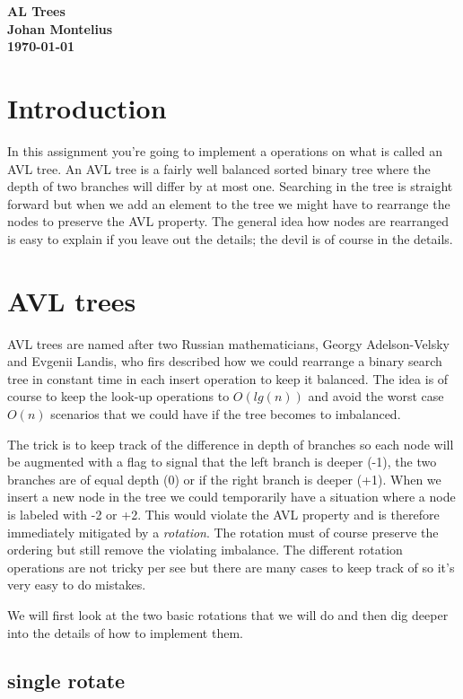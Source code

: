 \documentclass[a4paper,11pt]{article}
\newcommand{\nnsection}[1]{
\section*{#1}
\addcontentsline{toc}{section}{#1}
}
\begin{document}
\begin{center}
\vspace{20pt}
\textbf{\large AL Trees}\\
\vspace{10pt}
\textbf{Johan Montelius}\\ 
\vspace{10pt}
\textbf{\today}
\end{center}

\nnsection{Introduction}

In this assignment you're going to implement a operations on what is
called an AVL tree. An AVL tree is a fairly well balanced sorted
binary tree where the depth of two branches will differ by at most
one. Searching in the tree is straight forward but when we add an
element to the tree we might have to rearrange the nodes to preserve
the AVL property. The general idea how nodes are rearranged is easy to
explain if you leave out the details; the devil is of course in the
details.

\section{AVL trees}

AVL trees are named after two Russian mathematicians, Georgy
Adelson-Velsky and Evgenii Landis, who firs described how we could
rearrange a binary search tree in constant time in each insert
operation to keep it balanced. The idea is of course to keep the
look-up operations to $O(lg(n))$ and avoid the worst case $O(n)$
scenarios that we could have if the tree becomes to imbalanced.

The trick is to keep track of the difference in depth of branches so
each node will be augmented with a flag to signal that the left branch
is deeper (-1), the two branches are of equal depth (0) or if the
right branch is deeper (+1). When we insert a new node in the tree we
could temporarily have a situation where a node is labeled with -2 or
+2. This would violate the AVL property and is therefore immediately
mitigated by a {\em rotation}. The rotation must of course preserve
the ordering but still remove the violating imbalance. The different
rotation operations are not tricky per see but there are many cases to
keep track of so it's very easy to do mistakes. 

We will first look at the two basic rotations that we will do and then
dig deeper into the details of how to implement them.

\subsection{single rotate}
\end{document}
